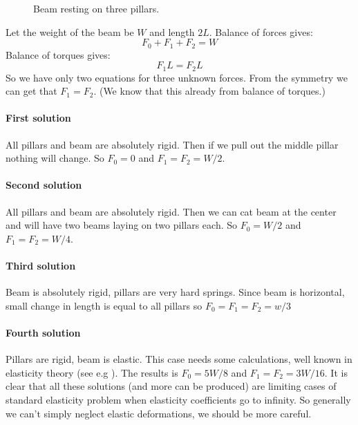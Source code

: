 \begin{figure}[htbp]
    \centering
    \caption{Beam resting on three pillars.}
    \label{beam3}
\end{figure}

Let the weight of the beam be $W$ and length $2 L$.
Balance of forces gives:
\begin{equation}
        F_0+F_1+F_2=W \label {bf}
\end{equation}
Balance of torques gives:
\begin{equation}
        F_1 L=F_2 L \label {bt}
\end{equation}
   So we have only two equations for three
unknown forces. From the symmetry we can get that $F_1=F_2$. 
(We know that this already from balance of torques.)
\paragraph{ First solution}
All pillars and beam are absolutely rigid. Then
if we pull out the middle pillar nothing will change.
So $F_0=0$ and $F_1=F_2=W/2$.
\paragraph{ Second solution}
All pillars and beam are absolutely rigid. Then
we can cat beam at the center and will have two
beams laying on two pillars each.
So $F_0=W/2$ and $F_1=F_2=W/4$.
\paragraph{ Third solution}
Beam is absolutely rigid, pillars are very hard springs.
Since beam is horizontal, small change in length is 
equal to all pillars so $F_0=F_1=F_2=w/3$
\paragraph{ Fourth solution}
Pillars are rigid, beam is elastic. This case needs
some calculations, well known in elasticity theory
(see e.g \cite {Landau-Lifshitz-7}).
The results is $F_0=5 W/8$ and $F_1=F_2=3 W/16$.
It is clear that all these solutions (and more can be
produced) are limiting cases of standard elasticity 
problem when elasticity coefficients go to infinity.
So generally we can't simply neglect elastic deformations,
we should be more careful.

